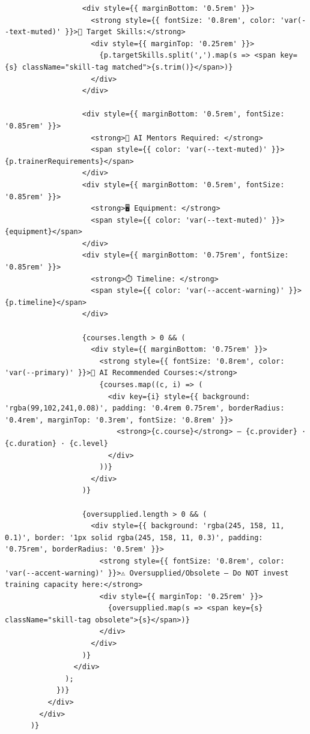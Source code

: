 \documentclass[12pt,a4paper]{report}
\begin{document}
\begin{verbatim}
                  <div style={{ marginBottom: '0.5rem' }}>
                    <strong style={{ fontSize: '0.8rem', color: 'var(--text-muted)' }}>🎯 Target Skills:</strong>
                    <div style={{ marginTop: '0.25rem' }}>
                      {p.targetSkills.split(',').map(s => <span key={s} className="skill-tag matched">{s.trim()}</span>)}
                    </div>
                  </div>

                  <div style={{ marginBottom: '0.5rem', fontSize: '0.85rem' }}>
                    <strong>🤖 AI Mentors Required: </strong>
                    <span style={{ color: 'var(--text-muted)' }}>{p.trainerRequirements}</span>
                  </div>
                  <div style={{ marginBottom: '0.5rem', fontSize: '0.85rem' }}>
                    <strong>🖥️ Equipment: </strong>
                    <span style={{ color: 'var(--text-muted)' }}>{equipment}</span>
                  </div>
                  <div style={{ marginBottom: '0.75rem', fontSize: '0.85rem' }}>
                    <strong>⏱️ Timeline: </strong>
                    <span style={{ color: 'var(--accent-warning)' }}>{p.timeline}</span>
                  </div>

                  {courses.length > 0 && (
                    <div style={{ marginBottom: '0.75rem' }}>
                      <strong style={{ fontSize: '0.8rem', color: 'var(--primary)' }}>🧠 AI Recommended Courses:</strong>
                      {courses.map((c, i) => (
                        <div key={i} style={{ background: 'rgba(99,102,241,0.08)', padding: '0.4rem 0.75rem', borderRadius: '0.4rem', marginTop: '0.3rem', fontSize: '0.8rem' }}>
                          <strong>{c.course}</strong> — {c.provider} · {c.duration} · {c.level}
                        </div>
                      ))}
                    </div>
                  )}

                  {oversupplied.length > 0 && (
                    <div style={{ background: 'rgba(245, 158, 11, 0.1)', border: '1px solid rgba(245, 158, 11, 0.3)', padding: '0.75rem', borderRadius: '0.5rem' }}>
                      <strong style={{ fontSize: '0.8rem', color: 'var(--accent-warning)' }}>⚠️ Oversupplied/Obsolete — Do NOT invest training capacity here:</strong>
                      <div style={{ marginTop: '0.25rem' }}>
                        {oversupplied.map(s => <span key={s} className="skill-tag obsolete">{s}</span>)}
                      </div>
                    </div>
                  )}
                </div>
              );
            })}
          </div>
        </div>
      )}


\end{verbatim}
\end{document}
